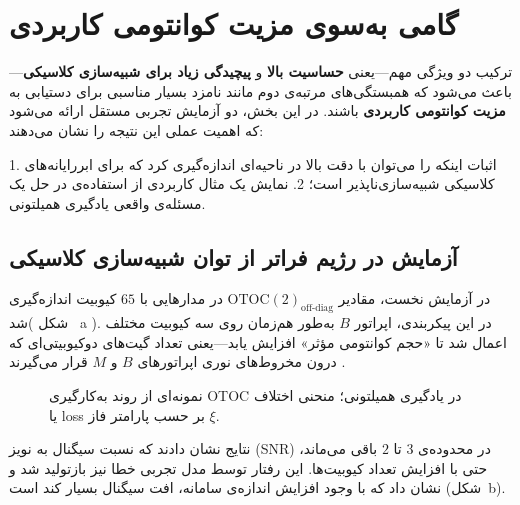 \section{گامی به‌سوی مزیت کوانتومی کاربردی}
\label{sec:advantage}

ترکیب دو ویژگی مهم—یعنی \textbf{حساسیت بالا} و \textbf{پیچیدگی زیاد برای شبیه‌سازی کلاسیکی}—باعث می‌شود که همبستگی‌های مرتبه‌ی دوم مانند  نامزد بسیار مناسبی برای دستیابی به \textbf{مزیت کوانتومی کاربردی} باشند.  
در این بخش، دو آزمایش تجربی مستقل ارائه می‌شود که اهمیت عملی این نتیجه را نشان می‌دهند:

1. اثبات اینکه  را می‌توان با دقت بالا در ناحیه‌ای اندازه‌گیری کرد که برای ابررایانه‌های کلاسیکی شبیه‌سازی‌ناپذیر است؛  
2. نمایش یک مثال کاربردی از استفاده‌ی  در حل یک مسئله‌ی واقعی یادگیری همیلتونی.

\subsection{آزمایش در رژیم فراتر از توان شبیه‌سازی کلاسیکی}

در آزمایش نخست، مقادیر \(\mathrm{OTOC(2)}_{\text{off-diag}}\) در مدارهایی با \(65\) کیوبیت اندازه‌گیری شد( شکل~ a \lr{\ref{fig4}}).
در این پیکربندی، اپراتور \(B\) به‌طور هم‌زمان روی سه کیوبیت مختلف اعمال شد تا «حجم کوانتومی مؤثر» افزایش یابد—یعنی تعداد گیت‌های دوکیوبیتی‌ای که درون مخروط‌های نوری اپراتورهای \(B\) و \(M\) قرار می‌گیرند \cite{Kechedzhi2024}.  
\begin{figure}[htbp]
	\centering
	\caption{نمونه‌ای از روند به‌کارگیری OTOC در یادگیری همیلتونی؛ منحنی اختلاف یا loss بر حسب پارامتر فاز \(\xi\).}
	\label{fig4}
\end{figure}
نتایج نشان دادند که نسبت سیگنال به نویز (SNR) در محدوده‌ی \(2 \text{ تا } 3\) باقی می‌ماند، حتی با افزایش تعداد کیوبیت‌ها. این رفتار توسط مدل تجربی خطا نیز بازتولید شد و نشان داد که با وجود افزایش اندازه‌ی سامانه، افت سیگنال بسیار کند است (شکل~b\lr{\ref{fig4}}).  

